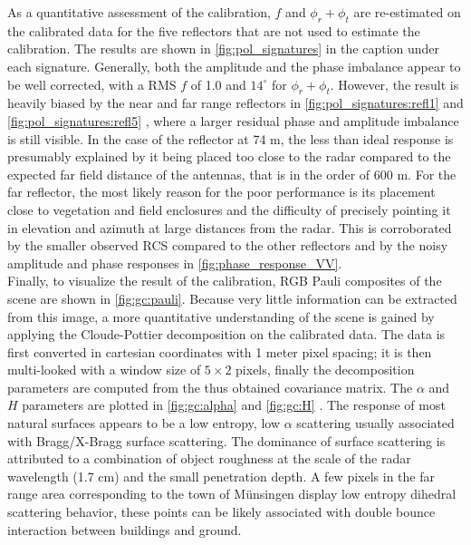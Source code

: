 As a quantitative assessment of the calibration,  $f$ and $\phi_r + \phi_t$ are re-estimated on the calibrated data for the five reflectors that are not used to estimate the calibration. The results are shown in \autoref{fig:pol_signatures} in the caption under each signature. Generally, both the amplitude and the phase imbalance appear to be well corrected, with a RMS $f$ of 1.0 and $14^\circ$ for $\phi_r + \phi_t$. However, the result is heavily biased by the near and far range reflectors in \autoref{fig:pol_signatures:refl1} and \autoref{fig:pol_signatures:refl5} , where a larger residual phase and amplitude imbalance is still visible. In the case of the reflector at 74 m, the less than ideal response is presumably explained by it being placed too close to the radar compared to the expected far field distance of the antennas, that is in the order of 600 m. For the far reflector, the most likely reason for the poor performance is its placement  close to vegetation and field enclosures and the difficulty of precisely pointing it in elevation and azimuth at large distances from the radar. This is corroborated by the smaller observed RCS compared to the other reflectors and by the noisy amplitude and phase responses in \autoref{fig:phase_response_VV}.\\
Finally, to visualize the result of the calibration, RGB Pauli composites of the scene are shown in \autoref{fig:gc:pauli}. Because very little information can be extracted from this image, a more quantitative understanding of the scene is gained by applying the Cloude-Pottier decomposition on the calibrated data. The data is first converted in cartesian coordinates with 1 meter pixel spacing; it is then multi-looked with a window size of $5 \times 2$ pixels, finally the decomposition parameters are computed from the thus obtained covariance matrix. The $\alpha$ and $H$ parameters are plotted in \autoref{fig:gc:alpha} and \autoref{fig:gc:H} . The response of most natural surfaces appears to be a low entropy, low $\alpha$ scattering usually associated with Bragg/X-Bragg surface scattering. The dominance of surface scattering is attributed to a combination of object roughness  at the scale of the radar wavelength (1.7 cm) and the small penetration depth. A few pixels in the far range area corresponding to the town of M\"{u}nsingen display low entropy dihedral scattering behavior, these points can be likely associated with double bounce interaction between buildings and ground.\\




